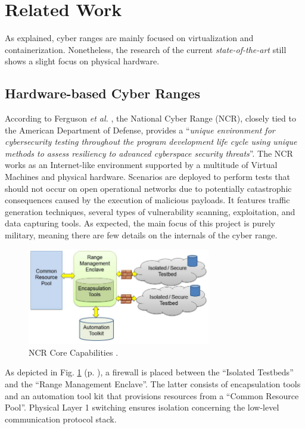 \section{Related Work} \label{sec:cyber_ranges}

As explained, cyber ranges are mainly focused on virtualization and containerization. Nonetheless, the research of the current \textit{state-of-the-art} still shows a slight focus on physical hardware.

\subsection{Hardware-based Cyber Ranges} \label{sec:hardware_based_cr}


According to Ferguson \textit{et al.} \cite{national_cr_ref}, the National Cyber Range (NCR), closely tied to the American Department of Defense, provides a ``\textit{unique environment for cybersecurity testing throughout the program development life cycle using unique methods to assess resiliency to advanced cyberspace security threats}''. The NCR works as an Internet-like environment supported by a multitude of Virtual Machines and physical hardware. Scenarios are deployed to perform tests that should not occur on open operational networks due to potentially catastrophic consequences caused by the execution of malicious payloads. It features traffic generation techniques, several types of vulnerability scanning, exploitation, and data capturing tools. As expected, the main focus of this project is purely military, meaning there are few details on the internals of the cyber range.

\begin{figure}[H]
    \includegraphics[width=8cm]{figures/ncr_core_capabilities.png}
    \caption{NCR Core Capabilities \cite{national_cr_ref}.}
    \label{fig:ncr_core_capabilities}
\end{figure}

As depicted in Fig. \ref{fig:ncr_core_capabilities} (p. \pageref{fig:ncr_core_capabilities}), a firewall is placed between the ``Isolated Testbeds'' and the ``Range Management Enclave''. The latter consists of encapsulation tools and an automation tool kit that provisions resources from a ``Common Resource Pool''. Physical Layer 1 switching ensures isolation concerning the low-level communication protocol stack.  

